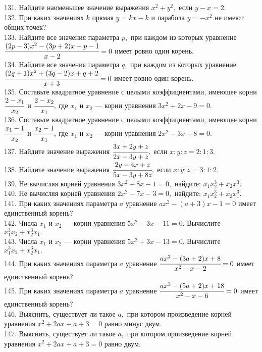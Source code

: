 131. Найдите наименьшее значение выражения $x^2+y^2,$ если $y-x=2.$\\
132. При каких значениях $k$ прямая $y=kx-k$ и парабола $y=-x^2$ не имеют общих точек?\\
133. Найдите все значения параметра $p,$ при каждом из которых уравнение\\ $\cfrac{(2p-3)x^2-(3p+2)x+p-1}{x-2}=0$ имеет ровно один корень.\\
134. Найдите все значения параметра $q,$ при каждом из которых уравнение\\ $\cfrac{(2q+1)x^2+(3q-2)x+q+2}{x+3}=0$ имеет ровно один корень.\\
135. Составьте квадратное уравнение с целыми коэффициентами, имеющее корни $\cfrac{2-x_1}{x_2}$ и $\cfrac{2-x_2}{x_1},$ где $x_1$ и $x_2$ --- корни уравнения $3x^2+2x-9=0.$\\
136. Составьте квадратное уравнение с целыми коэффициентами, имеющее корни $\cfrac{x_1-1}{x_2}$ и $\cfrac{x_2-1}{x_1},$ где $x_1$ и $x_2$ --- корни уравнения $2x^2-3x-8=0.$\\
137. Найдите значение выражения $\cfrac{3x+2y+z}{2x-3y+z},$ если $x:y:z=2:1:3.$\\
138. Найдите значение выражения $\cfrac{2y-4x+z}{5x-3y+8z},$ если $x:y:z=3:1:2.$\\
139. Не вычисляя корней уравнения $3x^2+8x-1=0,$ найдите: $x_1x_2^3+x_2x_1^3.$\\
140. Не вычисляя корней уравнения $2x^2-7x-3=0,$ найдите: $x_1x_2^3+x_2x_1^3.$\\
141. При каких значениях параметра $a$ уравнение $ax^2-(a+3)x-1=0$ имеет единственный корень?\\
142. Числа $x_1$ и $x_2$ --- корни уравнения $5x^2-3x-11=0.$ Вычислите $x_1^3x_2+x_2^3x_1.$\\
143. Числа $x_1$ и $x_2$ --- корни уравнения $5x^2+3x-13=0.$ Вычислите $x_1^3x_2+x_2^3x_1.$\\
144. При каких значениях параметра $a$ уравнение $\cfrac{ax^2-(3a+2)x+8}{x^2-x-2}=0$ имеет единственный корень?\\
145. При каких значениях параметра $a$ уравнение $\cfrac{ax^2-(5a+2)x+18}{x^2-x-6}=0$ имеет единственный корень?\\
146. Выяснить, существует ли такое $a,$ при котором произведение корней уравнения $x^2+2ax+a+3=0$ равно минус двум.\\
147. Выяснить, существует ли такое $a,$ при котором произведение корней уравнения $x^2+2ax+a+3=0$ равно двум.
\newpage
